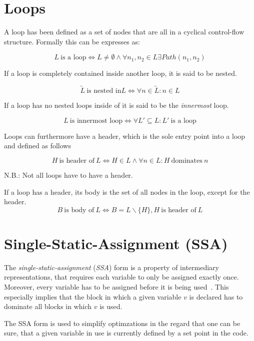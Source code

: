
\section{Loops}\label{sec:basics:loops}

A loop has been defined as a set of nodes that are all in a cyclical control-flow structure.
Formally this can be expresses as:

$$L~\text{is a loop} \Longleftrightarrow L \neq \emptyset \wedge \forall n_1, n_2 \in L \exists Path(n_1, n_2)$$

If a loop is completely contained inside another loop, it is said to be nested.

$$\tilde{L}~\text{is nested in} L \Longleftrightarrow \forall n \in \tilde{L}: n \in L$$

If a loop has no nested loops inside of it is said to be the \textit{innermost} loop.

$$L~\text{is innermost loop} \Longleftrightarrow \forall L' \subseteq L: L'~\text{is a loop}$$

Loops can furthermore have a header, which is the sole entry point into a loop~\cite{aebi18bachelorarbeit} and defined as follows

$$H~\text{is header of}~L \Longleftrightarrow H \in L \wedge \forall n \in L: H~\text{dominates}~n$$

N.B.: Not all loops have to have a header.

If a loop has a header, its body is the set of all nodes in the loop, except for the header.
$$B~\text{is body of}~L \Longleftrightarrow B = L \backslash \{H\}, H~\text{is header of}~L$$

\section{Single-Static-Assignment (SSA)}\label{sec:basics:ssa}

The \textit{single-static-assignment} (\textit{SSA}) form is a property of intermediary representations, that requires each variable to only be assigned exactly once.
Moreover, every variable has to be assigned before it is being used~\cite{cytron91}.
This especially implies that the block in which a given variable $v$ is declared has to dominate all blocks in which $v$ is used.

The SSA form is used to simplify optimzations in the regard that one can be sure, that a given variable in use is currently defined by a set point in the code.


